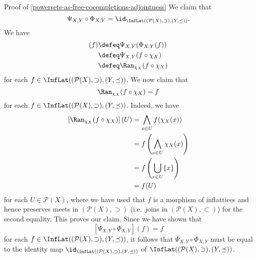 \begin{Proof}{Proof of \cref{powersets-as-free-cocompletions-adjointness}}
    We claim that
    \[
        \Psi_{X,Y}\circ\Phi_{X,Y}%
        =%
        \id_{\InfLat((\mathcal{P}(X),\supset),(Y,\preceq))}.%
    \]%
    We have
    \begin{align*}
        [\Psi_{X,Y}\circ\Phi_{X,Y}](f) &\defeq \Psi_{X,Y}(\Phi_{X,Y}(f))\\%
                                       &\defeq \Psi_{X,Y}(f\circ\chi_{X})\\%
                                       &\defeq \Ran_{\chi_{X}}(f\circ\chi_{X})\\%
    \end{align*}
    for each $f\in\InfLat((\mathcal{P}(X),\supset),(Y,\preceq))$. We now claim that
    \[
        \Ran_{\chi_{X}}(f\circ\chi_{X})%
        =%
        f%
    \]%
    for each $f\in\InfLat((\mathcal{P}(X),\supset),(Y,\preceq))$. Indeed, we have
    \begin{align*}
        \left[\Ran_{\chi_{X}}(f\circ\chi_{X})\right](U) &= \bigwedge_{x\in U}f(\chi_{X}(x))\\%
                                                        &= f\left(\bigwedge_{x\in U}\chi_{X}(x)\right)\\%
                                                        &= f\left(\bigcup_{x\in U}\{x\}\right)\\%
                                                        &= f(U)%
    \end{align*}
    for each $U\in\mathcal{P}(X)$, where we have used that $f$ is a morphism of inflattices and hence preserves meets in $(\mathcal{P}(X),\supset)$ (i.e.\ joins in $(\mathcal{P}(X),\subset)$) for the second equality. This proves our claim. Since we have shown that
    \[
        [\Psi_{X,Y}\circ\Phi_{X,Y}](f)%
        =%
        f%
    \]%
    for each $f\in\InfLat((\mathcal{P}(X),\supset),(Y,\preceq))$, it follows that $\Psi_{X,Y}\circ\Phi_{X,Y}$ must be equal to the identity map $\id_{\InfLat((\mathcal{P}(X),\supset),(Y,\preceq))}$ of $\InfLat((\mathcal{P}(X),\supset),(Y,\preceq))$.


\end{Proof}
